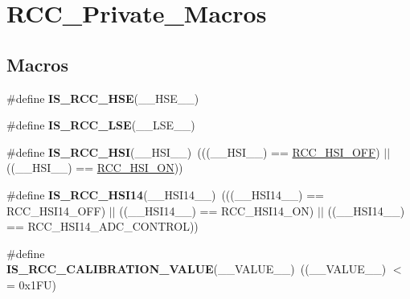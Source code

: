 \hypertarget{group___r_c_c___private___macros}{}\section{R\+C\+C\+\_\+\+Private\+\_\+\+Macros}
\label{group___r_c_c___private___macros}
\subsection*{Macros}
\begin{DoxyCompactItemize}
\item 
\#define {\bfseries I\+S\+\_\+\+R\+C\+C\+\_\+\+H\+SE}(\+\_\+\+\_\+\+H\+S\+E\+\_\+\+\_\+)
\item 
\#define {\bfseries I\+S\+\_\+\+R\+C\+C\+\_\+\+L\+SE}(\+\_\+\+\_\+\+L\+S\+E\+\_\+\+\_\+)
\item 
\mbox{\label{group___r_c_c___private___macros_ga230f351a740560f6b51cdc4b7051606e}} 
\#define {\bfseries I\+S\+\_\+\+R\+C\+C\+\_\+\+H\+SI}(\+\_\+\+\_\+\+H\+S\+I\+\_\+\+\_\+)~(((\+\_\+\+\_\+\+H\+S\+I\+\_\+\+\_\+) == \hyperlink{group___r_c_c___h_s_i___config_ga1b34d37d3b51afec0758b3ddc7a7e665}{R\+C\+C\+\_\+\+H\+S\+I\+\_\+\+O\+FF}) $\vert$$\vert$ ((\+\_\+\+\_\+\+H\+S\+I\+\_\+\+\_\+) == \hyperlink{group___r_c_c___h_s_i___config_ga0bf09ef9e46d5da25cced7b3122f92f5}{R\+C\+C\+\_\+\+H\+S\+I\+\_\+\+ON}))
\item 
\mbox{\label{group___r_c_c___private___macros_ga511dd32700ae44f2028255930f0bb99e}} 
\#define {\bfseries I\+S\+\_\+\+R\+C\+C\+\_\+\+H\+S\+I14}(\+\_\+\+\_\+\+H\+S\+I14\+\_\+\+\_\+)~(((\+\_\+\+\_\+\+H\+S\+I14\+\_\+\+\_\+) == R\+C\+C\+\_\+\+H\+S\+I14\+\_\+\+O\+FF) $\vert$$\vert$ ((\+\_\+\+\_\+\+H\+S\+I14\+\_\+\+\_\+) == R\+C\+C\+\_\+\+H\+S\+I14\+\_\+\+ON) $\vert$$\vert$ ((\+\_\+\+\_\+\+H\+S\+I14\+\_\+\+\_\+) == R\+C\+C\+\_\+\+H\+S\+I14\+\_\+\+A\+D\+C\+\_\+\+C\+O\+N\+T\+R\+OL))
\item 
\mbox{\label{group___r_c_c___private___macros_ga0811e1266f1690c9f967df0129cb9d66}} 
\#define {\bfseries I\+S\+\_\+\+R\+C\+C\+\_\+\+C\+A\+L\+I\+B\+R\+A\+T\+I\+O\+N\+\_\+\+V\+A\+L\+UE}(\+\_\+\+\_\+\+V\+A\+L\+U\+E\+\_\+\+\_\+)~((\+\_\+\+\_\+\+V\+A\+L\+U\+E\+\_\+\+\_\+) $<$= 0x1\+F\+U)
\item 
\mbox{\label{group___r_c_c___private___macros_ga2961f77a4ee7870f36d9f7f6729a0608}} 
$$
\end{DoxyCompactItemize}
